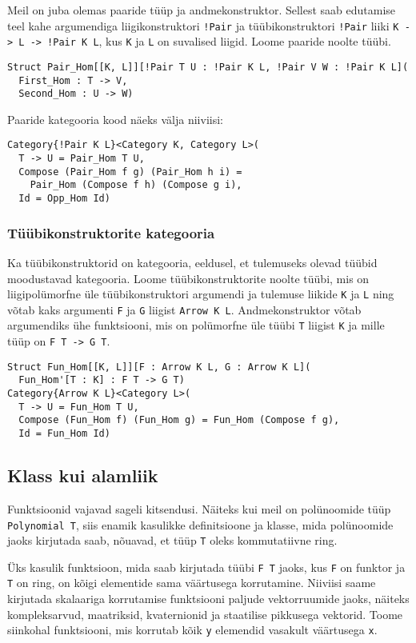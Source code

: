 \documentclass[12pt]{article}
\begin{document}
        Meil on juba olemas paaride tüüp ja andmekonstruktor. Sellest saab edutamise teel kahe argumendiga liigikonstruktori \verb"!Pair" ja tüübikonstruktori \verb"!Pair" liiki \verb"K -> L -> !Pair K L", kus \verb!K! ja \verb!L! on suvalised liigid. Loome paaride noolte tüübi.

        \begin{verbatim}Struct Pair_Hom[[K, L]][!Pair T U : !Pair K L, !Pair V W : !Pair K L](
  First_Hom : T -> V,
  Second_Hom : U -> W)\end{verbatim}

        Paaride kategooria kood näeks välja niiviisi:

        \begin{verbatim}Category{!Pair K L}<Category K, Category L>(
  T -> U = Pair_Hom T U,
  Compose (Pair_Hom f g) (Pair_Hom h i) =
    Pair_Hom (Compose f h) (Compose g i),
  Id = Opp_Hom Id)\end{verbatim}
      \subsubsection{Tüübikonstruktorite kategooria}
        Ka tüübikonstruktorid on kategooria, eeldusel, et tulemuseks olevad tüübid moodustavad kategooria. Loome tüübikonstruktorite noolte tüübi, mis on liigipolümorfne üle tüübikonstruktori argumendi ja tulemuse liikide \verb!K! ja \verb!L! ning võtab kaks argumenti \verb!F! ja \verb!G! liigist \verb!Arrow K L!. Andmekonstruktor võtab argumendiks ühe funktsiooni, mis on polümorfne üle tüübi \verb!T! liigist \verb!K! ja mille tüüp on \verb!F T -> G T!.

        \begin{verbatim}Struct Fun_Hom[[K, L]][F : Arrow K L, G : Arrow K L](
  Fun_Hom'[T : K] : F T -> G T)
Category{Arrow K L}<Category L>(
  T -> U = Fun_Hom T U,
  Compose (Fun_Hom f) (Fun_Hom g) = Fun_Hom (Compose f g),
  Id = Fun_Hom Id)\end{verbatim}
    \subsection{Klass kui alamliik}
      Funktsioonid vajavad sageli kitsendusi. Näiteks kui meil on polünoomide tüüp \verb!Polynomial T!, siis enamik kasulikke definitsioone ja klasse, mida polünoomide jaoks kirjutada saab, nõuavad, et tüüp \verb!T! oleks kommutatiivne ring.

      Üks kasulik funktsioon, mida saab kirjutada tüübi \verb!F T! jaoks, kus \verb!F! on funktor ja \verb!T! on ring, on kõigi elementide sama väärtusega korrutamine. Niiviisi saame kirjutada skalaariga korrutamise funktsiooni paljude vektorruumide jaoks, näiteks kompleksarvud, maatriksid, kvaternionid ja staatilise pikkusega vektorid. Toome siinkohal funktsiooni, mis korrutab kõik \verb!y! elemendid vasakult väärtusega \verb!x!.
\end{document}
